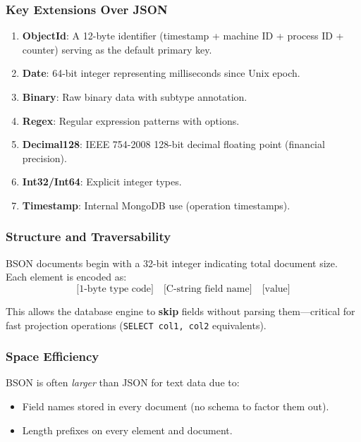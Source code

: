 \documentclass[12pt,a4paper]{article}
\begin{document}
\subsubsection{Key Extensions Over JSON}

\begin{enumerate}[noitemsep]
    \item \textbf{ObjectId}: A 12-byte identifier (timestamp + machine ID + process ID + counter) serving as the default primary key.
    \item \textbf{Date}: 64-bit integer representing milliseconds since Unix epoch.
    \item \textbf{Binary}: Raw binary data with subtype annotation.
    \item \textbf{Regex}: Regular expression patterns with options.
    \item \textbf{Decimal128}: IEEE 754-2008 128-bit decimal floating point (financial precision).
    \item \textbf{Int32/Int64}: Explicit integer types.
    \item \textbf{Timestamp}: Internal MongoDB use (operation timestamps).
\end{enumerate}

\subsubsection{Structure and Traversability}

BSON documents begin with a 32-bit integer indicating total document size. Each element is encoded as:
\[\text{[1-byte type code]} \quad \text{[C-string field name]} \quad \text{[value]}\]

This allows the database engine to \textbf{skip} fields without parsing them---critical for fast projection operations (\texttt{SELECT col1, col2} equivalents).

\subsubsection{Space Efficiency}

BSON is often \textit{larger} than JSON for text data due to:
\begin{itemize}[noitemsep]
    \item Field names stored in every document (no schema to factor them out).
    \item Length prefixes on every element and document.
\end{itemize}
\end{document}
